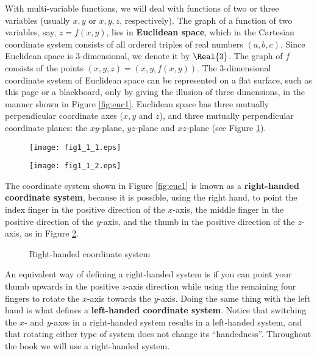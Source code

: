 With multi-variable functions, we will deal with functions of two or three variables (usually $x, y$ or
$x, y, z$, respectively).  The graph of a function of two variables, say, $z = f(x,y)$, lies in
\textbf{Euclidean space}, which in the Cartesian coordinate system consists of all ordered
triples of real numbers $(a, b, c)$.  Since Euclidean space is 3-dimensional, we denote it by
$\Real{3}$.  The graph of $f$ consists
of the points $(x, y, z) = (x, y, f(x, y))$.  The 3-dimensional coordinate system of Euclidean space can be
represented on a flat surface, such as this page or a blackboard, only by giving the illusion of three
dimensions, in the manner shown in Figure \ref{fig:euc1}.  Euclidean space has three mutually perpendicular
coordinate axes ($x, y$ and $z$), and three mutually perpendicular coordinate planes:
the $xy$-plane, $yz$-plane and $xz$-plane (see Figure \ref{fig:euc2}).
\newline
\begin{figure}[h]
\begin{minipage}[t]{7.5cm}
 \begin{center}
  \texttt{[image: fig1\_1\_1.eps]}
 \end{center}
 \caption[]{}
 \label{fig:euc1}
\end{minipage}
\begin{minipage}[t]{7.5cm}
 \begin{center}
  \texttt{[image: fig1\_1\_2.eps]}
 \end{center}
 \caption[]{}
 \label{fig:euc2}
\end{minipage}
\end{figure}
\newpage
The coordinate system shown in Figure \ref{fig:euc1} is known as a
\textbf{right-handed coordinate system}, because
it is possible, using the right hand, to point the index finger in the positive direction of the $x$-axis,
the middle finger in the positive direction of the $y$-axis, and the thumb in the positive direction of the
$z$-axis, as in Figure \ref{fig:rhs}.

\begin{figure}[h]
 \begin{center}
  
 \end{center}
 \caption[]{\quad Right-handed coordinate system}
 \label{fig:rhs}
\end{figure}

An equivalent way of defining a right-handed system is if you can point your thumb upwards in the positive
$z$-axis direction while using the remaining four fingers to rotate the $x$-axis towards the $y$-axis.
Doing the same thing
with the left hand is what defines a \textbf{left-handed coordinate system}.
Notice that switching the $x$- and $y$-axes
in a right-handed system results in a left-handed system, and that rotating either type of system does not change its
``handedness''.  Throughout the book we will use a right-handed system.

